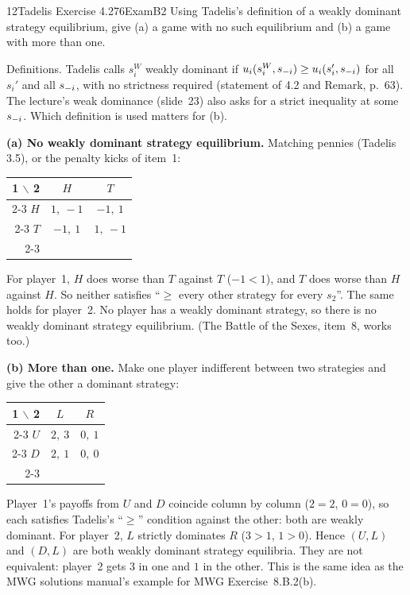 \begin{exsol}{12}{Tadelis Exercise 4.2}{76}{Exam}{B2}
\asked Using Tadelis's definition of a weakly dominant strategy equilibrium, give (a) a game
with no such equilibrium and (b) a game with more than one.

\method Definitions. Tadelis calls $s_i^W$ weakly dominant if
$u_i(s_i^W, s_{-i}) \ge u_i(s_i', s_{-i})$ for all $s_i'$ and all $s_{-i}$, with no strictness required
(statement of 4.2 and Remark, p.~63). The lecture's weak dominance (slide~23) also asks for a
strict inequality at some $s_{-i}$. Which definition is used matters for (b).

\solution
\textbf{(a) No weakly dominant strategy equilibrium.} Matching pennies (Tadelis 3.5), or the
penalty kicks of item~1:
\begin{center}
\begin{tabular}{r|c|c|}
\multicolumn{1}{r}{1 $\backslash$ 2} & \multicolumn{1}{c}{$H$} & \multicolumn{1}{c}{$T$}\\ \cline{2-3}
$H$ & $1,\ -1$ & $-1,\ 1$ \\ \cline{2-3}
$T$ & $-1,\ 1$ & $1,\ -1$ \\ \cline{2-3}
\end{tabular}
\end{center}
For player~1, $H$ does worse than $T$ against $T$ ($-1 < 1$), and $T$ does worse than $H$ against
$H$. So neither satisfies ``$\ge$ every other strategy for every $s_2$''. The same holds for
player~2. No player has a weakly dominant strategy, so there is no weakly dominant strategy
equilibrium. (The Battle of the Sexes, item~8, works too.)

\textbf{(b) More than one.} Make one player indifferent between two strategies and give the
other a dominant strategy:
\begin{center}
\begin{tabular}{r|c|c|}
\multicolumn{1}{r}{1 $\backslash$ 2} & \multicolumn{1}{c}{$L$} & \multicolumn{1}{c}{$R$}\\ \cline{2-3}
$U$ & $2,\ 3$ & $0,\ 1$ \\ \cline{2-3}
$D$ & $2,\ 1$ & $0,\ 0$ \\ \cline{2-3}
\end{tabular}
\end{center}
Player~1's payoffs from $U$ and $D$ coincide column by column ($2 = 2$, $0 = 0$), so each
satisfies Tadelis's ``$\ge$'' condition against the other: both are weakly dominant. For
player~2, $L$ strictly dominates $R$ ($3 > 1$, $1 > 0$). Hence $(U, L)$ and $(D, L)$ are both
weakly dominant strategy equilibria. They are not equivalent: player~2 gets $3$ in one and $1$
in the other. This is the same idea as the MWG solutions manual's example for MWG
Exercise~8.B.2(b).


\end{exsol}
